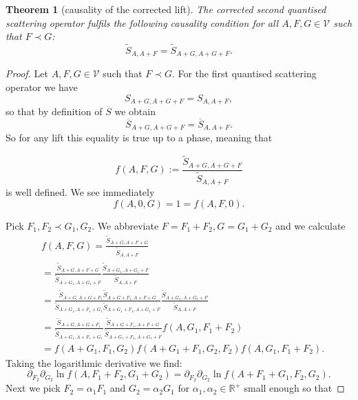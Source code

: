 \documentclass[b5paper,draft,openbib,12pt]{memoir}
\newtheorem{Thm}[Def]{Theorem}
\begin{document}
\begin{Thm}[causality of the corrected lift]
The corrected second quantised scattering operator fulfils the following causality condition for all \(A,F,G\in \mathcal{V}\) such that \(F\prec G\):
\begin{equation}
\tilde{S}_{A,A+F}=\tilde{S}_{A+G,A+G+F}.
\end{equation}
\end{Thm}
\begin{proof}
Let \(A,F,G\in\mathcal{V}\) such that \(F\prec G\). For the first quantised scattering operator we have
\begin{equation}
S_{A+G,A+G+F}=S_{A,A+F},
\end{equation}
so that by definition of \(\overline{S}\) we obtain
\begin{equation}\label{s bar causal}
\overline{S}_{A+G,A+G+F}=\overline{S}_{A,A+F}.
\end{equation}
So for any lift this equality is true up to a phase, meaning that 

\begin{equation}\label{f causal}
f(A,F,G):=\frac{\tilde{S}_{A+G,A+G+F}}{\tilde{S}_{A,A+F}}
\end{equation}
is well defined. We see immediately
\begin{equation}\label{vanish at axis}
f(A,0,G)=1=f(A,F,0).
\end{equation}

Pick \(F_1,F_2\prec G_1,G_2\). We abbreviate \(F=F_1+F_2, G=G_1+G_2\) and we calculate
\begin{align}
&f(A,F,G)=\frac{\tilde{S}_{A+G,A+F+G}}{\tilde{S}_{A,A+F}}\\
&=\frac{\tilde{S}_{A+G,A+F+G}}{\tilde{S}_{A+G_1,A+G_1+F}}\frac{\tilde{S}_{A+G_1,A+G_1+F}}{\tilde{S}_{A,A+F}}\\
&=\frac{\tilde{S}_{A+G,A+G+F_1} \tilde{S}_{A+G+F_1,A+F+G}}{\tilde{S}_{ A+G_1,A+F_1+G_1} \tilde{S}_{ A+G_1+F_1,A+G_1+F}}  \frac{\tilde{S}_{A+G_1,A+G_1+F}}{\tilde{S}_{A,A+F}}\\
&=\frac{\tilde{S}_{A+G,A+G+F_1}}{\tilde{S}_{A+G_1,A+F_1+G_1}} \frac{\tilde{S}_{A+G+F_1,A+F+G}}{\tilde{S}_{A+G_1+F_1,A+G_1+F}}  f(A,G_1,F_1+F_2)\\
&=f(A+G_1,F_1,G_2)f(A+G_1+F_1,G_2,F_2)
 f(A,G_1,F_1+F_2).
\end{align}
Taking the logarithmic derivative we find:
\begin{equation}\label{shift to small G,F}
\partial_{F_2}\partial_{G_2}\ln f(A,F_1+F_2,G_1+G_2)=\partial_{F_2}\partial_{G_2}\ln f(A+F_1+G_1,F_2,G_2).
\end{equation}
Next we pick \(F_2=\alpha_1 F_1\) and \(G_2=\alpha_2 G_1\) for \(\alpha_1,\alpha_2\in\mathbb{R}^+\) small enough so that


\end{proof}
\end{document}
